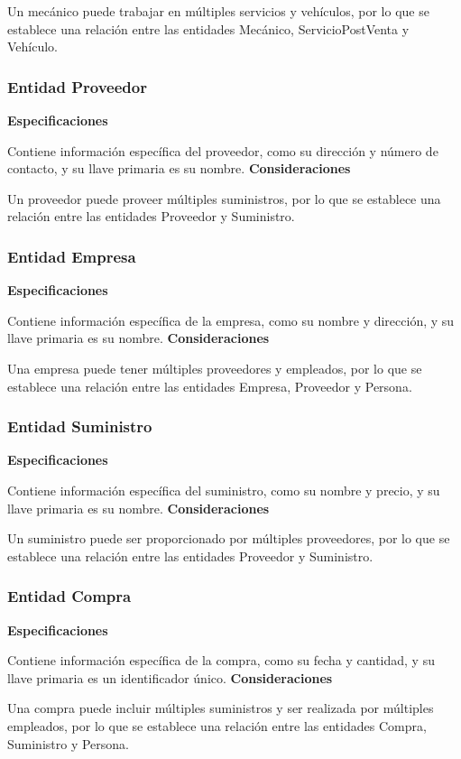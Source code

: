 \documentclass[12pt]{article}
\begin{document}
Un mecánico puede trabajar en múltiples servicios y vehículos, por lo que se establece una relación entre las entidades Mecánico, ServicioPostVenta y Vehículo.

\subsubsection{Entidad Proveedor}
\textbf{Especificaciones}

Contiene información específica del proveedor, como su dirección y número de contacto, y su llave primaria es su nombre.
\textbf{Consideraciones}

Un proveedor puede proveer múltiples suministros, por lo que se establece una relación entre las entidades Proveedor y Suministro.

\subsubsection{Entidad Empresa}
\textbf{Especificaciones}

Contiene información específica de la empresa, como su nombre y dirección, y su llave primaria es su nombre.
\textbf{Consideraciones}

Una empresa puede tener múltiples proveedores y empleados, por lo que se establece una relación entre las entidades Empresa, Proveedor y Persona.

\subsubsection{Entidad Suministro}
\textbf{Especificaciones}

Contiene información específica del suministro, como su nombre y precio, y su llave primaria es su nombre.
\textbf{Consideraciones}

Un suministro puede ser proporcionado por múltiples proveedores, por lo que se establece una relación entre las entidades Proveedor y Suministro.

\subsubsection{Entidad Compra}
\textbf{Especificaciones}

Contiene información específica de la compra, como su fecha y cantidad, y su llave primaria es un identificador único.
\textbf{Consideraciones}

Una compra puede incluir múltiples suministros y ser realizada por múltiples empleados, por lo que se establece una relación entre las entidades Compra, Suministro y Persona.
\end{document}
